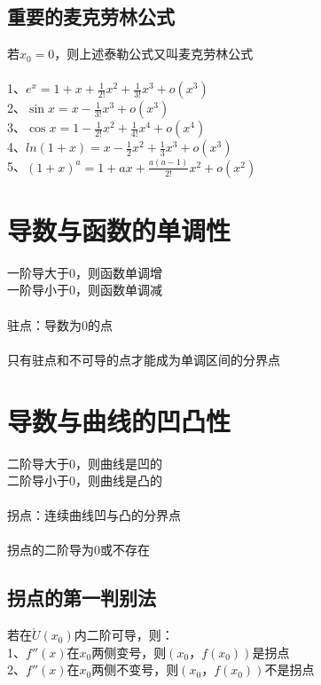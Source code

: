 \documentclass{article}
\begin{document}
\begin{flushleft}
	
	\subsection{重要的麦克劳林公式}
	
	若$x_0=0$，则上述泰勒公式又叫麦克劳林公式\\
	~\\
	
	1、$e^x=1+x+\frac{1}{2!}x^2+\frac{1}{3!}x^3+o(x^3)$\\
	2、$\sin x=x-\frac{1}{3!}x^3+o(x^3)$\\
	3、$\cos x=1-\frac{1}{2!}x^2+\frac{1}{4!}x^4+o(x^4)$\\
	4、$ln(1+x)=x-\frac{1}{2}x^2+\frac{1}{3}x^3+o(x^3)$\\
	5、$(1+x)^a=1+ax+\frac{a(a-1)}{2!}x^2+o(x^2)$\\
	
	\section{导数与函数的单调性}
	
	一阶导大于0，则函数单调增\\
	一阶导小于0，则函数单调减\\
	~\\
	驻点：导数为0的点\\
	~\\
	只有驻点和不可导的点才能成为单调区间的分界点\\
	
	\section{导数与曲线的凹凸性}
	
	二阶导大于0，则曲线是凹的\\
	二阶导小于0，则曲线是凸的\\
	~\\
	拐点：连续曲线凹与凸的分界点\\
	~\\
	拐点的二阶导为0或不存在\\

	\subsection{拐点的第一判别法}
	若在$\mathring{U}(x_0)$内二阶可导，则：\\
	1、$f''(x)$在$x_0$两侧变号，则$(x_0，f(x_0))$是拐点\\
	2、$f''(x)$在$x_0$两侧不变号，则$(x_0，f(x_0))$不是拐点\\


\end{flushleft}
\end{document}
